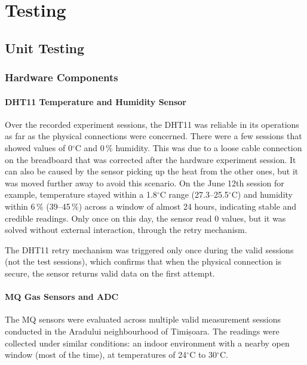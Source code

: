 

\chapter{Testing}
\label{ch:testing}

\section{Unit Testing}
\label{sec:unit-testing}

\subsection{Hardware Components}
\label{subsec:hw-testing}

\subsubsection*{DHT11 Temperature and Humidity Sensor}

Over the recorded experiment sessions, the DHT11 was reliable in its operations as far as the
physical connections were concerned. There were a few sessions that showed values of
0$^\circ$C and 0\,\% humidity. This was due to a loose cable connection on the breadboard
that was corrected after the hardware experiment session. It can also be caused by the sensor
picking up the heat from the other ones, but it was moved further away to avoid this scenario.
On the June 12th session for example, temperature stayed within a 1.8$^\circ$C range
(27.3--25.5$^\circ$C) and humidity within 6\,\% (39--45\,\%) across a window of almost
24 hours, indicating stable and credible readings. Only once on this day, the sensor read 0
values, but it was solved without external interaction, through the retry mechanism.

The DHT11 retry mechanism was triggered only once during the valid sessions (not the test
sessions), which confirms that when the physical connection is secure, the sensor returns valid
data on the first attempt.

\subsubsection*{MQ Gas Sensors and ADC}

The MQ sensors were evaluated across multiple valid measurement sessions conducted in the
Aradului neighbourhood of Timișoara. The readings were collected under similar conditions: an
indoor environment with a nearby open window (most of the time), at temperatures of
24$^\circ$C to 30$^\circ$C.

